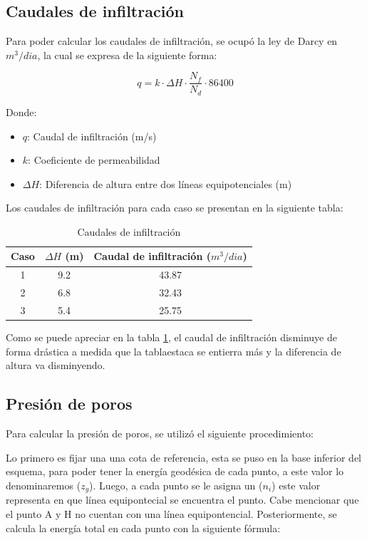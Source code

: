 \documentclass{article}
\begin{document}
\subsection{Caudales de infiltración}
Para poder calcular los caudales de infiltración, se ocupó la ley de Darcy en $m^3/dia$, la cual se expresa de la siguiente forma:

\begin{equation}
    q = k \cdot \Delta H \cdot \frac{N_f}{N_d} \cdot 86400
\end{equation}

Donde:
\begin{itemize}
    \item $q$: Caudal de infiltración (m/s)
    \item $k$: Coeficiente de permeabilidad
    \item $\Delta H$: Diferencia de altura entre dos líneas equipotenciales (m)
\end{itemize}



Los caudales de infiltración para cada caso se presentan en la siguiente tabla:

\begin{table}[h!]
  \centering
  \begin{tabular}{ccc}
    \hline
    \textbf{Caso} &\textbf{$\Delta H$ (m)}  &\textbf{Caudal de infiltración ($m^3/dia$)} \\
    \hline
    1 &9.2 &43.87 \\
    2 & 6.8&32.43\\
    3 &5.4 &25.75\\
    \hline
  \end{tabular}
  \caption{Caudales de infiltración}
  \label{tab:caudales}
\end{table}

Como se puede apreciar en la tabla \ref{tab:caudales}, el caudal de infiltración disminuye de forma drástica a medida que la tablaestaca se entierra más y la diferencia de altura va disminyendo. 

\subsection{Presión de poros}
Para calcular la presión de poros, se utilizó el siguiente procedimiento:

Lo primero es fijar una una cota de referencia, esta se puso en la base inferior del esquema, para poder tener la energía geodésica de cada punto, a este valor lo denominaremos ($z_g$). Luego, a cada punto se le asigna un ($n_i$) este valor representa en que línea equipontecial se encuentra el punto. Cabe mencionar que el punto A y H no cuentan con una línea equipontencial. Posteriormente, se calcula la energía total en cada punto con la siguiente fórmula:
\end{document}
